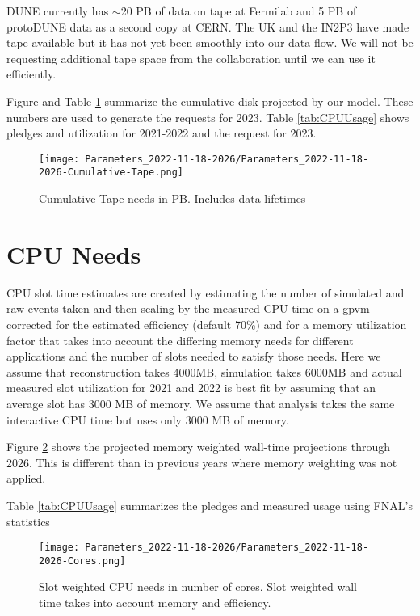 \documentclass[12pt]{article}
\begin{document}
DUNE currently has $\sim$20 PB of data on tape at Fermilab and 5 PB of protoDUNE data as a second copy at CERN.  The UK and the IN2P3 have made tape available but it has not yet been smoothly into our data flow.  We will not be requesting additional tape space from the collaboration until we can use it efficiently. 

Figure and Table  \ref{fig:Cumulative-Tape}  summarize the cumulative disk projected by our model. These numbers are used to generate the requests for 2023. Table \ref{tab:CPUUsage} shows pledges and utilization for 2021-2022 and the request for 2023.

\begin{figure}[h]
\centering\texttt{[image: Parameters\_2022-11-18-2026/Parameters\_2022-11-18-2026-Cumulative-Tape.png]}\caption{Cumulative Tape needs in PB. Includes data lifetimes}\label{fig:Cumulative-Tape}
\end{figure}

\section{CPU Needs}

CPU  slot time estimates are created by estimating the number of simulated and raw events taken and then scaling by the measured CPU time on a gpvm corrected for the estimated efficiency (default 70\%) and for a memory utilization factor that takes into account the differing memory needs for different applications and the number of slots needed to satisfy those needs.  Here we assume that reconstruction takes 4000MB, simulation takes 6000MB and actual measured  slot utilization for 2021 and 2022 is best fit by assuming that an average slot has 3000 MB of memory.    We assume that analysis takes the same interactive CPU time but uses only 3000 MB of memory.  

Figure \ref{fig:CoresMain} shows the projected memory weighted wall-time projections through 2026.  This is different than in previous years where memory weighting was not applied. 

Table \ref{tab:CPUUsage} summarizes the pledges\cite{CCB2022} and measured usage using FNAL's statistics\cite{fifemonDUNE}



\begin{figure}[h]
\centering\texttt{[image: Parameters\_2022-11-18-2026/Parameters\_2022-11-18-2026-Cores.png]}
\caption{Slot weighted CPU needs in number of cores. Slot weighted wall time takes into account memory and efficiency.}\label{fig:CoresMain}
\end{figure}
\end{document}
